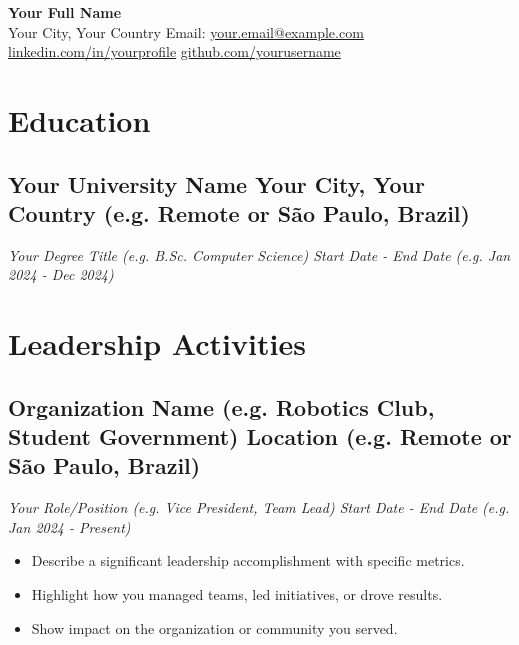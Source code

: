 \documentclass[a4paper,10pt]{article}
\begin{document}
\begin{center}
    {\LARGE \textbf{Your Full Name}} \\ [0.1cm]
    Your City, Your Country {\textbullet}
    Email: \href{mailto:your.email@example.com}{your.email@example.com} {\textbullet}
    \href{https://www.linkedin.com/in/yourprofile}{linkedin.com/in/yourprofile} {\textbullet}
    \href{https://github.com/yourusername}{github.com/yourusername}
\end{center}


\section{Education}
    \subsection*{\texorpdfstring{
        \textbf{Your University Name} \hfill Your City, Your Country (e.g. Remote or São Paulo, Brazil)
        }{
        Your University Name (Education) -- Your City, Your Country 
        }}
    \textit{Your Degree Title (e.g. B.Sc. Computer Science) \hfill Start Date - End Date (e.g. Jan 2024 - Dec 2024)}

\section{Leadership Activities} 
    \subsection*{\texorpdfstring{
        \textbf{Organization Name (e.g. Robotics Club, Student Government)} \hfill Location (e.g. Remote or São Paulo, Brazil)
        }{
        Organization Name (Leadership) -- Your City, Your Country
        }}
    \textit{Your Role/Position (e.g. Vice President, Team Lead) \hfill Start Date - End Date (e.g. Jan 2024 - Present)}
        \begin{itemize}
            \item Describe a significant leadership accomplishment with specific metrics.
            \item Highlight how you managed teams, led initiatives, or drove results.
            \item Show impact on the organization or community you served.
        \end{itemize}
\end{document}
